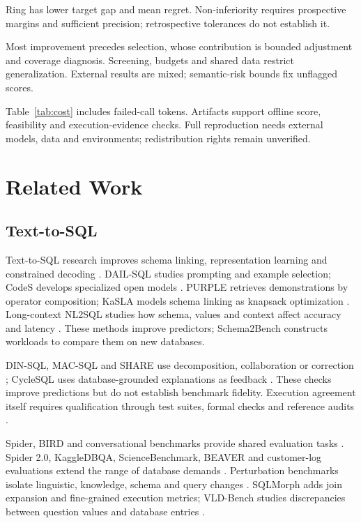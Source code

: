 Ring has lower target gap and mean regret. Non-inferiority requires prospective margins and sufficient precision; retrospective tolerances do not establish it.

Most improvement precedes selection, whose contribution is bounded adjustment and coverage diagnosis. Screening, budgets and shared data restrict generalization. External results are mixed; semantic-risk bounds fix unflagged scores.

Table~\ref{tab:cost} includes failed-call tokens. Artifacts support offline score, feasibility and execution-evidence checks. Full reproduction needs external models, data and environments; redistribution rights remain unverified.


\section{Related Work}\label{sec:related}
\subsection{Text-to-SQL}
Text-to-SQL research improves schema linking, representation learning and constrained decoding \citep{wang2020ratsql,lin2020bridge,lei2020schemalinking,li2023resdsql,scholak2021picard}. DAIL-SQL studies prompting and example selection; CodeS develops specialized open models \citep{gao2024dailsql,li2024codes}. PURPLE retrieves demonstrations by operator composition; KaSLA models schema linking as knapsack optimization \citep{ren2024purple,yuan2026kasla}. Long-context NL2SQL studies how schema, values and context affect accuracy and latency \citep{chung2025longcontext}. These methods improve predictors; Schema2Bench constructs workloads to compare them on new databases.

DIN-SQL, MAC-SQL and SHARE use decomposition, collaboration or correction \citep{pourreza2023dinsql,wang2025macsql,qu2025share}; CycleSQL uses database-grounded explanations as feedback \citep{fan2025cyclesql}. These checks improve predictions but do not establish benchmark fidelity. Execution agreement itself requires qualification through test suites, formal checks and reference audits \citep{zhong2020testsuite,klopfenstein2026spotit,pourreza2023evaluating,liu2025nl2sqlbugs}.

Spider, BIRD and conversational benchmarks provide shared evaluation tasks \citep{yu2018spider,li2023bird,yu2019sparc,yu2019cosql}. Spider 2.0, KaggleDBQA, ScienceBenchmark, BEAVER and customer-log evaluations extend the range of database demands \citep{lei2025spider2,lee2021kaggledbqa,zhang2024sciencebenchmark,chen2024beaver,ganti2024failures}. Perturbation benchmarks isolate linguistic, knowledge, schema and query changes \citep{gan2021spidersyn,gan2021spiderdk,pi2022adveta,chang2023drspider,zhou2026sqlstructeval,perlitz2026polysql}. SQLMorph adds join expansion and fine-grained execution metrics; VLD-Bench studies discrepancies between question values and database entries \citep{malekpour2026sqlmorph,koukouvinis2026value}.


